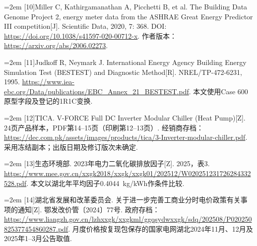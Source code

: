 \documentclass[12pt,a4paper]{article}
\newenvironment{refsectionflush}
  {\par\sloppy\setlength{\parindent}{0pt}\setlength{\parskip}{0pt}}
  {\par\fussy}
\newcommand{\refentry}[2]{%
  \par\noindent\hangindent=2em\hangafter=1
  [#1]\enspace #2\par}
\begin{document}
\begin{refsectionflush}
\refentry{10}{Miller C, Kathirgamanathan A, Picchetti B, et al. The Building Data Genome Project 2, energy meter data from the ASHRAE Great Energy Predictor III competition{[}J{]}. Scientific Data, 2020, 7: 368. DOI: \url{https://doi.org/10.1038/s41597-020-00712-x}. 作者版本：\url{https://arxiv.org/abs/2006.02273}.}
\refentry{11}{Judkoff R, Neymark J. International Energy Agency Building Energy Simulation Test (BESTEST) and Diagnostic Method{[}R{]}. NREL/TP-472-6231, 1995. \url{https://www.iea-ebc.org/Data/publications/EBC_Annex_21_BESTEST.pdf}. 本文使用Case 600原型字段及登记的1R1C变换.}
\refentry{12}{TICA. V-FORCE Full DC Inverter Modular Chiller (Heat Pump){[}Z{]}. 24页产品样本，PDF第14--15页（印刷第12--13页）. 经销商存档：\url{https://dec.com.pk/assets/images/products/tica/3-Inverter-modular-chiller.pdf}. 采用冻结副本；出版日期及修订版次未确定.}
\refentry{13}{生态环境部. 2023年电力二氧化碳排放因子{[}Z{]}. 2025，表3. \url{https://www.mee.gov.cn/xxgk2018/xxgk/xxgk01/202512/W020251231726284332528.pdf}. 本文以湖北年平均因子0.4044~kg/kWh作条件比较.}
\refentry{14}{湖北省发展和改革委员会. 关于进一步完善工商业分时电价政策有关事项的通知{[}Z{]}. 鄂发改价管〔2024〕77号. 政府存档：\url{https://www.liangzh.gov.cn/lzhxxgk/xxgkml/ggqsydwxxgk/sdq/202508/P020250825377454860287.pdf}. 月度价格按复现包保存的国家电网湖北2024年11月、12月及2025年1--3月公告取值.}
\end{refsectionflush}

\clearpage
\end{document}

